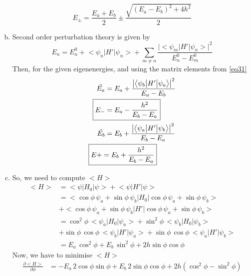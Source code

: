 \documentclass[12 pt]{article}
\numberwithin{equation}{section}
\begin{document}
\begin{enumerate}[a)]
\begin{equation}
  \boxed{E_\pm = \frac{E_a+E_b}{2}\pm \frac{\sqrt{(E_a-E_b)^2 + 4h^2}}{2}}
\end{equation}
\item 
Second order perturbation theory is given by 
\begin{equation}\label{eq310}
  E_n = E_n^0 + \big<\psi_n\big|H'\big|\psi_n\big> +\sum_{m\neq n}
  \frac{\big|\big<\psi_m\big|H'\big|\psi_n\big> \big|^2}{E_n^0 - E_m^0}
\end{equation}
Then, for the given eigenenergies, and using the matrix elements from \autoref{eq31}
\begin{align}\label{eq311}
  \tilde{E_a} &= E_a + \frac{\big|\big<\psi_b\big|H'\big|\psi_a\big> \big|^2}{E_a-E_b}\nonumber\\
  \Aboxed{E_- &= E_a-\frac{h^2}{E_b-E_a}}\\
 \tilde{E_b} &= E_b + \frac{\big|\big<\psi_a\big|H'\big|\psi_b\big> \big|^2}{E_b-E_a}\nonumber\\
  \Aboxed{E+ &= E_b + \frac{h^2}{E_b-E_a}}
  \end{align}
\item So, we need to compute $\big<H\big>$ 
\begin{equation}\label{312}
  \begin{aligned}
    \big<H\big> &= \big<\psi\big|H_0\big|\psi\big> + \big<\psi\big|H'\big|\psi\big>\\
                &= \big<\cos\phi\,\psi_a + \sin\phi\,\psi_b|H_0\big|\cos\phi\,\psi_a + 
                \sin\phi\,\psi_b\big>\\
                &+\big<\cos\phi\,\psi_a + \sin\phi\,\psi_b|H'\big|\cos\phi\,\psi_a + 
                \sin\phi\,\psi_b\big>\\
                &= \cos^2\phi\,\big<\psi_a\big|H_0\big|\psi_a\big>+
                \sin^2\phi\,\big<\psi_b\big|H_0\big|\psi_b\big>\\
                &+ \sin\phi\,\cos\phi\,\big<\psi_b\big|H'\big|\psi_a\big> +
\sin\phi\,\cos\phi\,\big<\psi_a\big|H'\big|\psi_b\big>\\
                &= E_a\,\cos^2\phi + E_b\,\sin^2\phi + 2h\sin\phi\cos\phi
  \end{aligned}
\end{equation}
Now, we have to minimise $\big<H\big>$
\begin{equation*}
\begin{aligned}
  \frac{\partial \big<H\big>}{\partial\phi} &= -E_a\,2\cos\phi\sin\phi + E_b\,2\sin\phi\cos\phi
  + 2h(\cos^2\phi - \sin^2\phi)\\

\end{aligned}
\end{equation*}
\end{enumerate}
\end{document}
